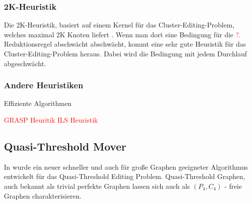 \documentclass[12pt,a4paper,onecolumn,oneside,titlepage]{article}
\let\oldReturn\Return
\renewcommand{\Return}{\State\oldReturn}
\newcommand\todo[1]{\textcolor{red}{#1}}
\begin{document}
\subsubsection{2K-Heuristik}
Die 2K-Heuristik, basiert auf einem Kernel für das Cluster-Editing-Problem, welches maximal 2K Knoten liefert \cite{Chen12}. Wenn man dort eine Bedingung für die \todo{?.} Reduktionsregel abschwächt  abschwächt, kommt eine sehr gute Heuristik für das Cluster-Editing-Problem heraus. Dabei wird die Bedingung mit jedem Durchlauf abgeschwächt.
\pagebreak
\begin{center}
  \label{algo:2k}
\begin{algorithmic}[1]
			\EndFor
		\EndIf
	\EndFor
\EndWhile

\EndFunction

	\EndFor

\EndFunction
{}
	\EndFor

\EndFunction
\end{algorithmic}
\end{center}


\subsubsection{Andere Heuristiken}
\cite{Bastos2014} Effiziente Algorithmen

 \todo{GRASP Heuritik}
 \todo{ILS Heuristik}

\subsection{Quasi-Threshold Mover}
In \cite{BrandesHSW15} wurde ein neuer schneller und auch für große Graphen geeigneter Algorithmus entwickelt für das Quasi-Threshold Editing Problem. Quasi-Threshold Graphen, auch bekannt als trivial perfekte Graphen lassen sich auch als $(P_4, C_4)$ - freie Graphen charakterisieren. 
\end{document}

